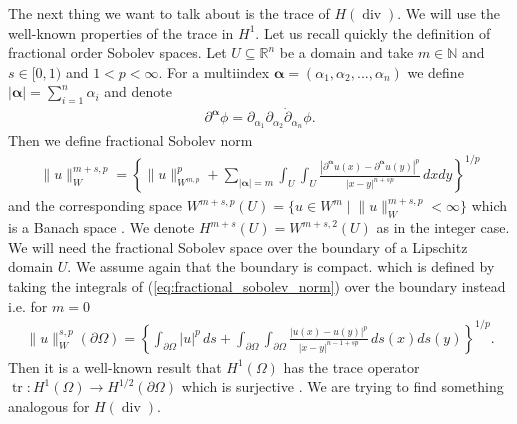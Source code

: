 \documentclass[12pt,a4paper]{article}
\numberwithin{equation}{subsection}
\numberwithin{lemma}{subsection}
\theoremstyle{definition}
\DeclareMathOperator{\diver}{div}
\DeclareMathOperator{\tr}{tr}
\newcommand{\naturalnum}{\mathbb{N}}
\newcommand{\real}{\mathbb{R}}
\begin{document}
The next thing we want to talk about is the trace of $H(\diver)$. 
We will use the well-known properties of the trace in $H^1$. 
Let us recall 
quickly the definition of fractional order Sobolev spaces. Let 
$U \subseteq \real^n$ be a domain and take $m \in \naturalnum$ and 
$s \in [0, 1)$ and $1 < p < \infty$. For a multiindex $\boldsymbol{\alpha} = 
(\alpha_1, \alpha_2, ..., \alpha_n)$ we define $|\boldsymbol{\alpha}| = \sum_{i=1}^n \alpha_i$ 
and denote 
\begin{align}
    \partial^{\bm{\alpha}} \phi = 
    \partial_{\alpha_1} \partial_{\alpha_2} \dot \partial_{\alpha_n} \phi.
\end{align}
Then we define fractional Sobolev norm
\begin{align}
    \lVert u \rVert _W^{m+s, p} = \left\{ \lVert u \rVert ^p_{W^{m, p}} + 
        \sum_{|\bm{\alpha}|=m} \int_U \int_U 
        \frac{|\partial^{\bm{\alpha}} u(x) - \partial^{\bm{\alpha}} u(y)|^p}
        {|x - y|^{n+sp}} \, dx dy\right\}^{1/p}\label{eq:fractional_sobolev_norm}
\end{align}
and the corresponding space $W^{m+s, p}(U) = \{ u \in W^m \mid \lVert u \rVert _W^{m+s, p} < \infty \}$ 
which is a Banach space \cite[p.42]{monk}. We denote 
$H^{m+s}(U) = W^{m+s, 2}(U)$ as in the integer case. We will need the 
fractional Sobolev space over the boundary of a Lipschitz domain $U$. We assume 
again that the boundary is compact.
which is defined by taking the integrals of (\ref{eq:fractional_sobolev_norm}) 
over the boundary instead i.e. for $m = 0$
\begin{align*}
    \lVert u \rVert _W^{s, p}(\partial \Omega) = \left\{ \int_{\partial\Omega} |u|^p \, ds + 
        \int_{\partial\Omega} \int_{\partial\Omega}
        \frac{|u(x) - u(y)|^p}
        {|x - y|^{n-1+sp}} \, ds(x) ds(y)\right\}^{1/p}.
\end{align*}
Then it 
is a well-known result that $H^1(\Omega)$ has the trace operator 
$\tr: H^1(\Omega) \rightarrow H^{1/2}(\partial \Omega)$ which is surjective \cite{arnold}.
We are trying to find something analogous for $H(\diver)$.
\end{document}
